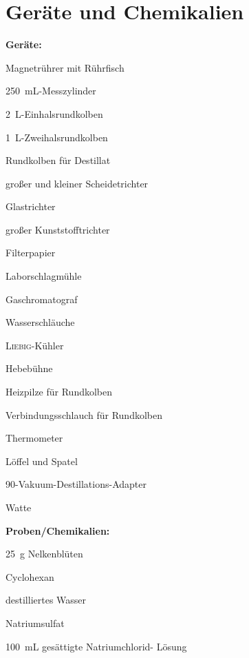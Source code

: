 \section{Geräte und Chemikalien}
\label{sec:geraete}

\textbf{Geräte:}
\begin{itemize}
	\begin{minipage}{0.45\textwidth}
			\item Magnetrührer mit Rührfisch
		\item \SI{250}{\milli \liter}-Messzylinder 
		\item \SI{2}{\liter}-Einhalsrundkolben
		\item \SI{1}{\liter}-Zweihalsrundkolben
		\item Rundkolben für Destillat
		\item großer und kleiner Scheidetrichter
		\item Glastrichter
		\item großer Kunststofftrichter
		\item Filterpapier 
		\item Laborschlagmühle
	\end{minipage}
	\begin{minipage}{0.45\textwidth}
		\item Gaschromatograf
		\item Wasserschläuche
		\item \textsc{Liebig}-Kühler
		\item Hebebühne
		\item Heizpilze für Rundkolben
		\item Verbindungsschlauch für Rundkolben
		\item Thermometer
		\item Löffel und Spatel
		\item \SI{90}{\degrees}-Vakuum-Destillations-Adapter
		\item Watte
	\end{minipage}
\end{itemize}

\vspace*{5mm}

\textbf{Proben/Chemikalien:}
\begin{itemize}
	\begin{minipage}{0.45 \textwidth}
		\item \SI{25}{\gram} Nelkenblüten
		\item Cyclohexan
		\item destilliertes Wasser
	\end{minipage}
\begin{minipage}{0.45 \textwidth}
		\item Natriumsulfat
		\item \SI{100}{\milli \liter} gesättigte Natriumchlorid- Lösung
\end{minipage}
\end{itemize}



